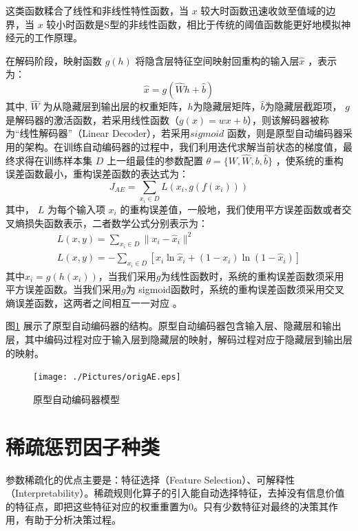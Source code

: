 \documentclass[oneside]{ZJUthesis}
\begin{document}
这类函数糅合了线性和非线性特性函数，当 $x$ 较大时函数迅速收敛至值域的边界，当 $x$ 较小时函数是S型的非线性函数，相比于传统的阈值函数能更好地模拟神经元的工作原理。

在解码阶段，映射函数 $g(h)$ 将隐含层特征空间映射回重构的输入层$\hat x$ ，表示为：
\begin{equation}
	\hat x=g(\hat{W}h+\hat b)
\end{equation}	
其中, $\hat{W}$ 为从隐藏层到输出层的权重矩阵，$h$为隐藏层矩阵，$\hat b$为隐藏层截距项， $g$ 是解码器的激活函数，若采用线性函数（$g(x)=wx+b$），则该解码器被称为``线性解码器''（Linear Decoder），若采用$sigmoid$ 函数，则是原型自动编码器采用的架构。在训练自动编码器的过程中，我们利用迭代求解当前状态的梯度值，最终求得在训练样本集 $D$ 上一组最佳的参数配置 $\theta=\{W,\hat W,b,\hat b\}$ ，使系统的重构误差函数最小，重构误差函数的表达式为：
\begin{equation}
	J_{AE}=\sum\limits_{x_i \in D}L(x_i,g(f(x_i)))
\end{equation}
其中， $L$ 为每个输入项 $x_i$ 的重构误差值，一般地，我们使用平方误差函数或者交叉熵损失函数表示，二者数学公式分别表示为：
\begin{equation}\begin{array}{l}
	L(x,y)=\sum\limits_{x_i \in D}\|x_i-\hat x_i\|^2  \\
    L(x,y)=-\sum\limits_{x_i \in D}[x_i \ln \hat x_i+(1-x_i)\ln(1-\hat x_i)]
\end{array}\end{equation}
其中$\hat x_i=g(h(x_i))$，当我们采用$g$为线性函数时，系统的重构误差函数须采用平方误差函数。当我们采用$g$为 sigmoid函数时，系统的重构误差函数须采用交叉熵误差函数，这两者之间相互一一对应 \cite{17}。



图\ref{fig:origAE} 展示了原型自动编码器的结构。原型自动编码器包含输入层、隐藏层和输出层，其中编码过程对应于输入层到隐藏层的映射，解码过程对应于隐藏层到输出层的映射。

\begin{figure}[H]
\centering
\texttt{[image: ./Pictures/origAE.eps]}
\caption{原型自动编码器模型}
\label{fig:origAE}
\end{figure}


\section{稀疏惩罚因子种类}
参数稀疏化的优点主要是：特征选择（Feature Selection）、可解释性（Interpretability）\cite{DBLP:journals/jmlr/Hoyer04}。稀疏规则化算子的引入能自动选择特征，去掉没有信息价值的特征点，即把这些特征对应的权重重置为0。只有少数特征对最终的决策其作用，有助于分析决策过程。
\end{document}
